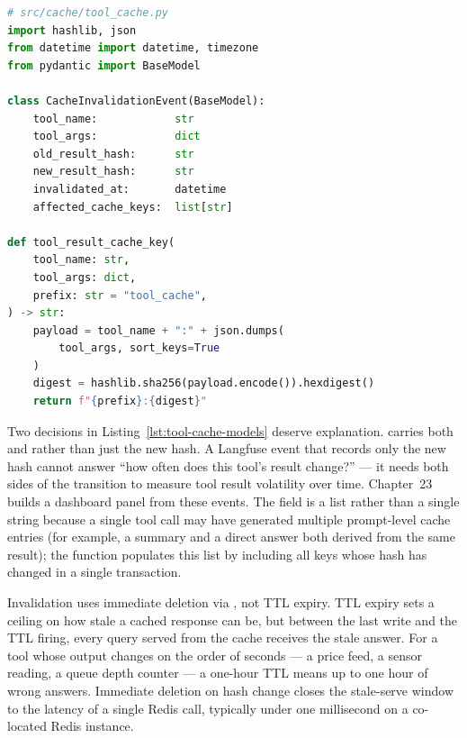\begin{lstlisting}[language=Python,
  caption={Tool cache key construction and CacheInvalidationEvent model},
  label={lst:tool-cache-models}]
# src/cache/tool_cache.py
import hashlib, json
from datetime import datetime, timezone
from pydantic import BaseModel

class CacheInvalidationEvent(BaseModel):
    tool_name:            str
    tool_args:            dict
    old_result_hash:      str
    new_result_hash:      str
    invalidated_at:       datetime
    affected_cache_keys:  list[str]

def tool_result_cache_key(
    tool_name: str,
    tool_args: dict,
    prefix: str = "tool_cache",
) -> str:
    payload = tool_name + ":" + json.dumps(
        tool_args, sort_keys=True
    )
    digest = hashlib.sha256(payload.encode()).hexdigest()
    return f"{prefix}:{digest}"
\end{lstlisting}

Two decisions in Listing~\ref{lst:tool-cache-models} deserve explanation.
 carries both  and
 rather than just the new hash. A Langfuse event
that records only the new hash cannot answer ``how often does this tool's
result change?'' --- it needs both sides of the transition to measure
tool result volatility over time. Chapter~23 builds a dashboard panel
from these events. The  field is a list
rather than a single string because a single tool call may have generated
multiple prompt-level cache entries (for example, a summary and a direct
answer both derived from the same  result); the
 function populates this list by including
all keys whose hash has changed in a single transaction.

Invalidation uses immediate deletion via , not TTL
expiry. TTL expiry sets a ceiling on how stale a cached response can be,
but between the last write and the TTL firing, every query served from
the cache receives the stale answer. For a tool whose output changes on
the order of seconds --- a price feed, a sensor reading, a queue depth
counter --- a one-hour TTL means up to one hour of wrong answers.
Immediate deletion on hash change closes the stale-serve window to the
latency of a single Redis  call, typically under one
millisecond on a co-located Redis instance.


